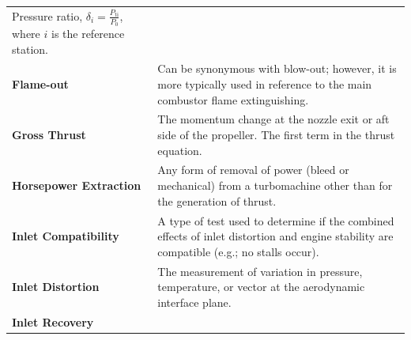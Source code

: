\documentclass[
]{book}
\begin{document}
\begin{longtable}[]{@{}ll@{}}
\begin{minipage}[t]{0.71\columnwidth}
Pressure ratio, \(\delta_{i} = \frac{P_{\mathrm{ti}}}{P_{0}}\), where \(i\) is the reference station.\strut
\end{minipage}\tabularnewline
\begin{minipage}[t]{0.24\columnwidth}\raggedright
\textbf{Flame-out}\strut
\end{minipage} & \begin{minipage}[t]{0.71\columnwidth}\raggedright
Can be synonymous with blow-out; however, it is more typically used in reference to the main combustor flame extinguishing.\strut
\end{minipage}\tabularnewline
\begin{minipage}[t]{0.24\columnwidth}\raggedright
\textbf{Gross Thrust}\strut
\end{minipage} & \begin{minipage}[t]{0.71\columnwidth}\raggedright
The momentum change at the nozzle exit or aft side of the propeller. The first term in the thrust equation.\strut
\end{minipage}\tabularnewline
\begin{minipage}[t]{0.24\columnwidth}\raggedright
\textbf{Horsepower Extraction}\strut
\end{minipage} & \begin{minipage}[t]{0.71\columnwidth}\raggedright
Any form of removal of power (bleed or mechanical) from a turbomachine other than for the generation of thrust.\strut
\end{minipage}\tabularnewline
\begin{minipage}[t]{0.24\columnwidth}\raggedright
\textbf{Inlet Compatibility}\strut
\end{minipage} & \begin{minipage}[t]{0.71\columnwidth}\raggedright
A type of test used to determine if the combined effects of inlet distortion and engine stability are compatible (e.g.; no stalls occur).\strut
\end{minipage}\tabularnewline
\begin{minipage}[t]{0.24\columnwidth}\raggedright
\textbf{Inlet Distortion}\strut
\end{minipage} & \begin{minipage}[t]{0.71\columnwidth}\raggedright
The measurement of variation in pressure, temperature, or vector at the aerodynamic interface plane.\strut
\end{minipage}\tabularnewline
\begin{minipage}[t]{0.24\columnwidth}\raggedright
\textbf{Inlet Recovery}\strut

\end{minipage}
\end{longtable}
\end{document}
